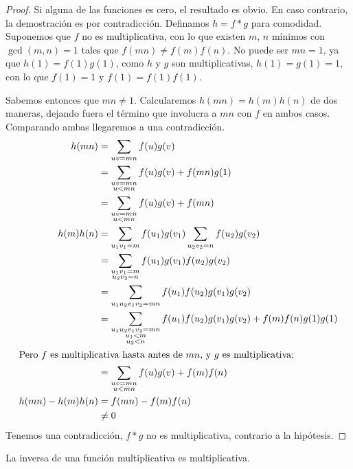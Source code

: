   \begin{proof}
    Si alguna de las funciones es cero,
    el resultado es obvio.
    En caso contrario,
    la demostración es por contradicción.
    Definamos \(h = f * g\) para comodidad.
    Suponemos que \(f\) no es multiplicativa,
    con lo que existen \(m\), \(n\) mínimos con \(\gcd(m, n) = 1\)
    tales que \(f(m n) \ne f(m) f(n)\).
    No puede ser \(m n = 1\),
    ya que \(h(1) = f(1) g(1)\),
    como \(h\) y \(g\) son multiplicativas,
    \(h(1) = g(1) = 1\),
    con lo que \(f(1) = 1\) y \(f(1) = f(1) f(1)\).

    Sabemos entonces que \(m n \ne 1\).
    Calcularemos \(h(m n) = h(m) h(n)\) de dos maneras,
    dejando fuera el término que involucra a \(m n\) con \(f\)
    en ambos casos.
    Comparando ambas llegaremos a una contradicción.
    \begin{align*}
      h(m n)
	&= \sum_{u v = m n} f(u) g(v) \\
	&= \sum_{\substack{u v = m n \\ u < m n}} f(u) g(v)
	     + f(m n) g(1) \\
	&= \sum_{\substack{u v = m n \\ u < m n}} f(u) g(v)
	     + f(m n) \\
      h(m) h(n)
	&= \sum_{u_1 v_1 = m} f(u_1) g(v_1)
	     \sum_{u_2 v_2 = n} f(u_2) g(v_2) \\
	&= \sum_{\substack{u_1 v_1 = m \\ u_2 v_2 = n}}
	     f(u_1) g(v_1) f(u_2) g(v_2) \\
	&= \sum_{u_1 u_2 v_1 v_2 = m n}
	     f(u_1) f(u_2) g(v_1) g(v_2) \\
	&= \sum_{\substack{u_1 u_2 v_1 v_2 = m n \\
			   u_1 < m \\
			   u_2 < n}}
	     f(u_1) f(u_2) g(v_1) g(v_2)
	     + f(m) f(n) g(1) g(1) \\
    \intertext{Pero \(f\) es multiplicativa hasta antes de \(m n\),
	       y \(g\) es multiplicativa:}
	&= \sum_{\substack{u v = m n \\ u < m n}}
	     f(u) g(v)
	     + f(m) f(n) \\
      h(m n) - h(m) h(n)
	&= f(m n) - f(m) f(n) \\
	&\ne 0
    \end{align*}
    Tenemos una contradicción,
    \(f * g\) no es multiplicativa,
    contrario a la hipótesis.
  \end{proof}
  \begin{corollary}
    \label{cor:Dirichlet-inverse-multiplicative}
    La inversa de una función multiplicativa es multiplicativa.
  \end{corollary}
